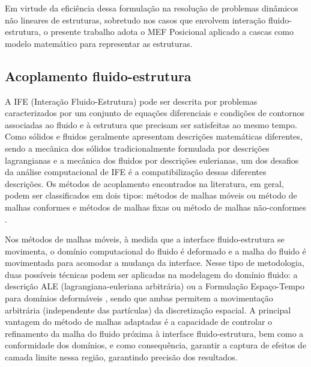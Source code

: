 Em virtude da eficiência dessa formulação na resolução de problemas dinâmicos não lineares de estruturas, sobretudo nos casos que envolvem interação fluido-estrutura, o presente trabalho adota o MEF Posicional aplicado a cascas como modelo matemático para representar as estruturas.

\subsection{Acoplamento fluido-estrutura}
\label{couplingsection}

A IFE (Interação Fluido-Estrutura) pode ser descrita por problemas caracterizados por um conjunto de equações diferenciais e condições de contornos associadas ao fluido e à estrutura que precisam ser satisfeitas ao mesmo tempo. Como sólidos e fluidos geralmente apresentam descrições matemáticas diferentes, sendo a mecânica dos sólidos tradicionalmente formulada por descrições lagrangianas e a mecânica dos fluidos por descrições eulerianas, um dos desafios da análise computacional de IFE é a compatibilização dessas diferentes descrições. Os métodos de acoplamento encontrados na literatura, em geral, podem ser classificados em dois tipos: métodos de malhas móveis ou método de malhas conformes e métodos de malhas fixas ou método de malhas não-conformes \cite{BazilevsTT:2013b,Houetal:2012}.

Nos métodos de malhas móveis, à medida que a interface fluido-estrutura se movimenta, o domínio computacional do fluido é deformado e a malha do fluido é movimentada para acomodar a mudança da interface. Nesse tipo de metodologia, duas possíveis técnicas podem ser aplicadas na modelagem do domínio fluido: a descrição ALE (lagrangiana-euleriana arbitrária) \cite{DoneaGH:1982,HughesLZ:1981,KanchiM:2007} ou a Formulação Espaço-Tempo para domínios deformáveis \cite{TakizawaT:2012,TezduyarBL:1992,TezduyarBML:1992b}, sendo que ambas permitem a movimentação arbitrária (independente das partículas) da discretização espacial. A principal vantagem do método de malhas adaptadas é a capacidade de controlar o refinamento da malha do fluido próxima à interface fluido-estrutura, bem como a conformidade dos domínios, e como consequência, garantir a captura de efeitos de camada limite nessa região, garantindo precisão dos resultados.

